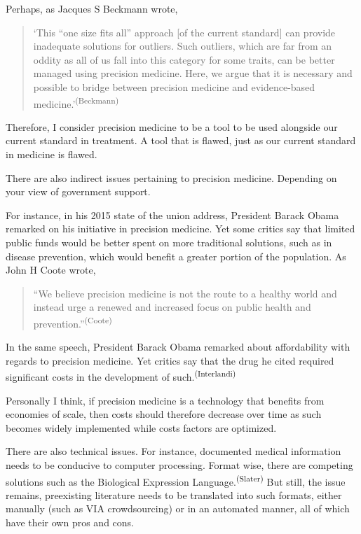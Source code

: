 Perhaps,  as Jacques S Beckmann wrote,
\begin{quotation}
`This ``one size fits all'' approach [of the current standard] can provide inadequate solutions for outliers. Such outliers, which are far from an oddity as all of us fall into this category for some traits, can be better managed using precision medicine. Here, we argue that it is necessary and possible to bridge between precision medicine and evidence-based medicine.'\textsuperscript{(Beckmann)}
\end{quotation}

Therefore, I consider precision medicine to be a tool to be used alongside our current standard in treatment. A tool that is flawed, just as our current standard in medicine is flawed. 

There are also indirect issues pertaining to precision medicine. Depending on your view of government support.

For instance, in his 2015 state of the union address, President Barack Obama remarked on his initiative in precision medicine. Yet some critics say that limited public funds would be better spent on more traditional solutions, such as in disease prevention, which would benefit a greater portion of the population. As John H Coote wrote,
\begin{quotation}
    ``We believe precision medicine is not the route to a healthy world and instead urge a renewed and increased focus on public health and prevention.''\textsuperscript{(Coote)}
\end{quotation}

In the same speech, President Barack Obama remarked about affordability with regards to precision medicine. Yet critics say that the drug he cited required significant costs in the development of such.\textsuperscript{(Interlandi)}

Personally I think, if precision medicine is a technology that benefits from economies of scale, then costs should therefore decrease over time as such becomes widely implemented while costs factors are optimized. 

There are also technical issues. For instance, documented medical information needs to be conducive to computer processing. Format wise, there are competing solutions such as the Biological Expression Language.\textsuperscript{(Slater)} But still, the issue remains, preexisting literature needs to be translated into such formats, either manually (such as VIA crowdsourcing) or in an automated manner, all of which have their own pros and cons. 

